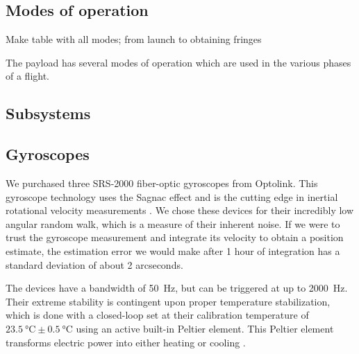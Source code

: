 \begin{figure}[!ht]
	\centering
	
	\caption[The celestial sphere]{}
	\label{fig:celestialSphere}
    \end{figure}

\begin{figure}[!ht]
	\centering
	
	\caption[The star camera reference frame]{}
	\label{fig:starcamRefFrame}
    \end{figure}

\subsection{Modes of operation}

Make table with all modes; from launch to obtaining fringes

The payload has several modes of operation which are used in the various phases of a flight.


\subsection{Subsystems}



\subsection{Gyroscopes}

We purchased three SRS-2000 fiber-optic gyroscopes from Optolink. This gyroscope technology uses the Sagnac effect and is the cutting edge in inertial rotational velocity measurements \citep[for a review of the state-of-the-art see, \textit{e.g.}][]{ElBadaoui:2014fr}. We chose these devices for their incredibly low angular random walk, which is a measure of their inherent noise. If we were to trust the gyroscope measurement and integrate its velocity to obtain a position estimate, the estimation error we would make after 1 hour of integration has a standard deviation of about 2 arcseconds.

The devices have a bandwidth of \SI{50}{\hertz}, but can be triggered at up to \SI{2000}{\hertz}. Their extreme stability is contingent upon proper temperature stabilization, which is done with a closed-loop set at their calibration temperature of $\SI{23.5}{\celsius}\pm\SI{0.5}{\celsius}$ using an active built-in Peltier element. This Peltier element transforms electric power into either heating or cooling \citep{Peltier:1834vu}.

